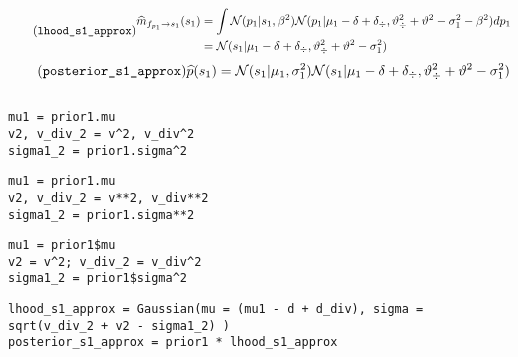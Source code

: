 \documentclass[article]{jss}
\newcommand{\N}{\mathcal{N}}
\begin{document}
%
\begin{equation}\label{eq:^m_fp_s} \tag{\texttt{lhood\_s1\_approx}}
\begin{split}
\widehat{m}_{f_{p_1} \rightarrow s_1}(s_1) & = \int \N(p_1|s_1,\beta^2) \N(p_1| \mu_1 - \delta + \delta_{\div}, \vartheta_{\div}^2 + \vartheta^2 - \sigma_1^2 - \beta^2)dp_1 \\
& = \N(s_1| \mu_1 - \delta + \delta_{\div}, \vartheta_{\div}^2 + \vartheta^2 - \sigma_1^2)
\end{split}
\end{equation}
%
\begin{equation}\label{eq:^p_s} \tag{\texttt{posterior\_s1\_approx}}
 \widehat{p}(s_1) = \N(s_1|\mu_1, \sigma_1^2) \N(s_1| \mu_1 - \delta + \delta_{\div}, \vartheta_{\div}^2 + \vartheta^2 - \sigma_1^2)
\end{equation}
%
\begin{lstlisting}[backgroundcolor=\color
{white},label=lst:lhood_s1_approx, caption=\relax, belowskip=-1.0 \baselineskip, aboveskip=-0 \baselineskip]
\end{lstlisting}
\begin{paracol}{3}
\begin{lstlisting}[backgroundcolor=\color{julia},belowskip=-0.77 \baselineskip]
mu1 = prior1.mu
v2, v_div_2 = v^2, v_div^2
sigma1_2 = prior1.sigma^2
\end{lstlisting}
\switchcolumn
\begin{lstlisting}[backgroundcolor=\color{python},belowskip=-0.77 \baselineskip]
mu1 = prior1.mu
v2, v_div_2 = v**2, v_div**2 
sigma1_2 = prior1.sigma**2
\end{lstlisting}
\switchcolumn
\begin{lstlisting}[backgroundcolor=\color{r},belowskip=-0.77 \baselineskip]
mu1 = prior1$mu
v2 = v^2; v_div_2 = v_div^2
sigma1_2 = prior1$sigma^2
\end{lstlisting}
\end{paracol}
\begin{lstlisting}[backgroundcolor=\color{all}]
lhood_s1_approx = Gaussian(mu = (mu1 - d + d_div), sigma = sqrt(v_div_2 + v2 - sigma1_2) )
posterior_s1_approx = prior1 * lhood_s1_approx
\end{lstlisting}
\end{document}
